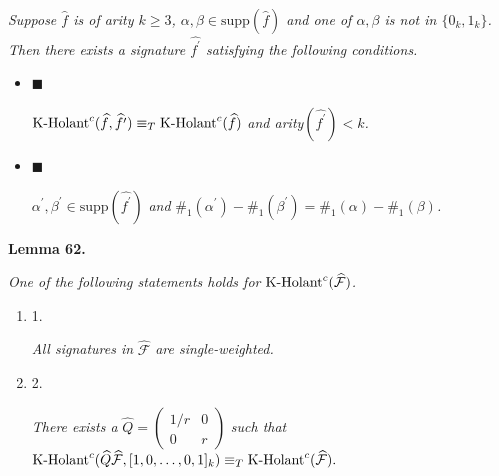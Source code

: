 \emph{Suppose $\widehat{f}$ is of arity $k\geq 3$, $\alpha,\beta\in\text{supp}(\widehat{f})$ and one of $\alpha,\beta$ is not in $\{0_{k},1_{k}\}$. Then there exists a signature $\widehat{f^{\prime}}$ satisfying the following conditions.}\par


\begin{itemize}


\item[] 
$\blacksquare$ 


$\textup{{K-Holant}}^{c}(\widehat{f},\widehat{f^{\prime}})\equiv_{T}\textup{{K-Holant}}^{c}(\widehat{f})$\emph{ and arity}$(\widehat{f^{\prime}})<k$\emph{.}\par





\item[] 
$\blacksquare$ 


$\alpha^{\prime},\beta^{\prime}\in\text{supp}(\widehat{f^{\prime}})$\emph{ and }$\#_{1}(\alpha^{\prime})-\#_{1}(\beta^{\prime})=\#_{1}(\alpha)-\#_{1}(\beta)$\emph{.}\par





\end{itemize}







\par\medskip\noindent\textbf{
\textbf{Lemma 62}\textbf{.}
}\par



\emph{One of the following statements holds for $\textup{{K-Holant}}^{c}(\widehat{\mathcal{F}})$.}\par


\begin{enumerate}


\item[] 
1. 


\emph{All signatures in }$\widehat{\mathcal{F}}$\emph{ are single-weighted.}\par





\item[] 
2. 


\emph{There exists a }$\widehat{Q}=\begin{pmatrix}1/r&0\\
0&r\end{pmatrix}$\emph{ such that }$\textup{{K-Holant}}^{c}(\widehat{Q}\widehat{\mathcal{F}},[1,0,\dots,0,1]_{k})\equiv_{T}\textup{{K-Holant}}^{c}(\widehat{\mathcal{F}}).$\emph{}\par





\end{enumerate}




